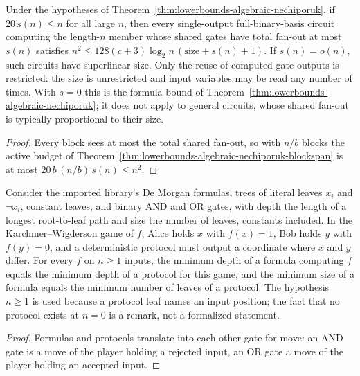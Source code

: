 \begin{corollary}
  \label{cor:lowerbounds-algebraic-nechiporuk-shared}
  \leanok
  Under the hypotheses of Theorem~\ref{thm:lowerbounds-algebraic-nechiporuk},
  if $20\,s(n) \le n$ for all large $n$, then every single-output
  full-binary-basis circuit computing the length-$n$ member whose shared gates
  have total fan-out at most $s(n)$ satisfies
  $n^2 \le 128(c+3)\log_2 n\,(\mathrm{size} + s(n) + 1)$. If $s(n) = o(n)$,
  such circuits have superlinear size. Only the reuse of computed gate outputs
  is restricted: the size is unrestricted and input variables may be read any
  number of times. With $s = 0$ this is the formula bound of
  Theorem~\ref{thm:lowerbounds-algebraic-nechiporuk}; it does not apply to
  general circuits, whose shared fan-out is typically proportional to their
  size.
\end{corollary}
\begin{proof}
  \leanok
  Every block sees at most the total shared fan-out, so with $n/b$ blocks the
  active budget of
  Theorem~\ref{thm:lowerbounds-algebraic-nechiporuk-blockspan} is at most
  $20\,b\,(n/b)\,s(n) \le n^2$.
\end{proof}

\begin{theorem}
  \label{thm:lowerbounds-algebraic-kw}
  \leanok
  Consider the imported library's De Morgan formulas, trees of literal leaves
  $x_i$ and $\neg x_i$, constant leaves, and binary AND and OR gates, with depth
  the length of a longest root-to-leaf path and size the number of leaves,
  constants included. In the Karchmer--Wigderson game of $f$, Alice holds $x$
  with $f(x) = 1$, Bob holds $y$ with $f(y) = 0$, and a deterministic protocol
  must output a coordinate where $x$ and $y$ differ. For every $f$ on $n \ge 1$
  inputs, the minimum depth of a formula computing $f$ equals the minimum
  depth of a protocol for this game, and the minimum size of a formula equals
  the minimum number of leaves of a protocol. The hypothesis $n \ge 1$ is used
  because a protocol leaf names an input position; the fact that no protocol
  exists at $n = 0$ is a remark, not a formalized statement.
\end{theorem}
\begin{proof}
  \leanok
  Formulas and protocols translate into each other gate for move: an AND gate
  is a move of the player holding a rejected input, an OR gate a move of the
  player holding an accepted input.
\end{proof}

